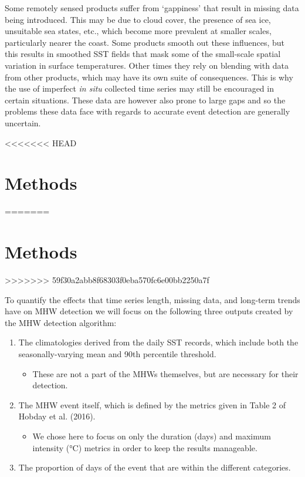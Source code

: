 \documentclass[]{article}
\providecommand{\tightlist}{%
  \setlength{\itemsep}{0pt}\setlength{\parskip}{0pt}}
\begin{document}
{Some remotely sensed products suffer from `gappiness' that result in
missing data being introduced. This may be due to cloud cover, the
presence of sea ice, unsuitable sea states, etc., which become more
prevalent at smaller scales, particularly nearer the coast. Some
products smooth out these influences, but this results in smoothed SST
fields that mask some of the small-scale spatial variation in surface
temperatures. Other times they rely on blending with data from other
products, which may have its own suite of consequences. This is why the
use of imperfect \emph{in situ} collected time series may still be
encouraged in certain situations. These data are however also prone to
large gaps and so the problems these data face with regards to accurate
event detection are generally uncertain.

<<<<<<< HEAD
\hypertarget{methods}{%
\section{Methods}\label{methods}}
=======
\section{Methods}\label{methods}
>>>>>>> 59f30a2abb8f68303f0eba570fc6e00bb2250a7f

To quantify the effects that time series length, missing data, and
long-term trends have on MHW detection we will focus on the following
three outputs created by the MHW detection algorithm:

\begin{enumerate}
\def\labelenumi{\arabic{enumi})}
\tightlist
\item
  The climatologies derived from the daily SST records, which include
  both the seasonally-varying mean and 90th percentile threshold.

  \begin{itemize}
  \tightlist
  \item
    These are not a part of the MHWs themselves, but are necessary for
    their detection.
  \end{itemize}
\item
  The MHW event itself, which is defined by the metrics given in Table 2
  of Hobday et al. (2016).

  \begin{itemize}
  \tightlist
  \item
    We chose here to focus on only the duration (days) and maximum
    intensity (°C) metrics in order to keep the results manageable.
  \end{itemize}
\item
  The proportion of days of the event that are within the different
  categories.


\end{enumerate}}
\end{document}

